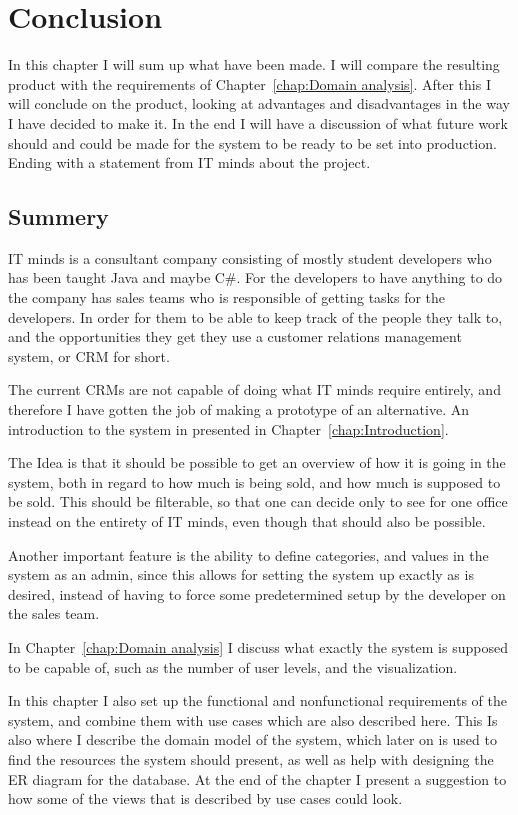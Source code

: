 \chapter{Conclusion}
\label{chap:Conclusion}
In this chapter I will sum up what have been made. I will compare the resulting
product with the requirements of Chapter~\ref{chap:Domain analysis}. After this
I will conclude on the product, looking at advantages and disadvantages in the
way I have decided to make it.
In the end I will have a discussion of what future work should and could be made
for the system to be ready to be set into production. Ending with a statement
from IT minds about the project.

\section{Summery}
IT minds is a consultant company consisting of mostly student developers who has
been taught Java and maybe C\#. For the developers to have anything to do the
company has sales teams who is responsible of getting tasks for the developers.
In order for them to be able to keep track of the people they talk to, and the
opportunities they get they use a customer relations management system, or CRM
for short. 

The current CRMs are not capable of doing what IT minds require entirely, and
therefore I have gotten the job of making a prototype of an alternative. An
introduction to the system in presented in Chapter~\ref{chap:Introduction}.

The Idea is that it should be possible to get an overview of how it is going in
the system, both in regard to how much is being sold, and how much is supposed
to be sold. This should be filterable, so that one can decide only to see for
one office instead on the entirety of IT minds, even though that should also be
possible. 

Another important feature is the ability to define categories, and
values in the system as an admin, since this allows for setting the system
up exactly as is desired, instead of having to force some predetermined setup by
the developer on the sales team.

In Chapter~\ref{chap:Domain analysis} I discuss what exactly the system is
supposed to be capable of, such as the number of user levels, and the
visualization.

In this chapter I also set up the functional and nonfunctional requirements of
the system, and combine them with use cases which are also described here. This
Is also where I describe the domain model of the system, which later on is used
to find the resources the system should present, as well as help with designing
the ER diagram for the database. At the end of the chapter I present a suggestion
to how some of the views that is described by use cases could look.

